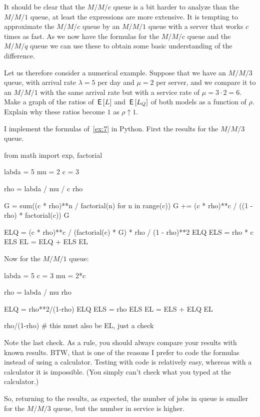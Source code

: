 \begin{exercise}
 It should be clear that the $M/M/c$ queue is a bit harder to analyze than the $M/M/1$ queue, at least the expressions are more extensive.
 It is tempting to approximate the $M/M/c$ queue by an $M/M/1$ queue with a server that works $c$ times as fast.
 As we now have the formulas for the $M/M/c$ queue and the $M/M/q$ queue we can use these to obtain some basic understanding of the difference.
 
 Let us therefore consider a numerical example.
 Suppose that we have an $M/M/3$ queue, with arrival rate $\lambda = 5$ per day and $\mu=2$ per server, and we compare it to an $M/M/1$ with the same arrival rate but with a service rate of $\mu = 3\cdot 2 = 6$.
 Make a graph of the ratios of $\,\mathsf{E}\left[L\right]$ and $\,\mathsf{E}\left[L_Q\right]$ of both models as a function of $\rho$.
 Explain why these ratios become $1$ as $\rho\uparrow 1$. 
\begin{solution}
I implement the formulas of~\cref{ex:7} in Python. First the results for the $M/M/3$ queue.

\begin{pyconsole}
from math import exp, factorial

labda = 5
mu = 2
c = 3

rho = labda / mu / c
rho

G = sum((c * rho)**n / factorial(n) for n in range(c))
G += (c * rho)**c / ((1 - rho) * factorial(c))
G

ELQ = (c * rho)**c / (factorial(c) * G) * rho / (1 - rho)**2
ELQ
ELS = rho * c
ELS
EL = ELQ + ELS
EL
\end{pyconsole}

Now for the $M/M/1$ queue:

\begin{pyconsole}
labda = 5
c = 3
mu = 2*c

rho = labda / mu 
rho

ELQ = rho**2/(1-rho)
ELQ
ELS = rho
ELS
EL = ELS + ELQ
EL

rho/(1-rho) # this must also be EL, just a check
\end{pyconsole}

Note the last check. As a rule, you should always compare your results
with known results. BTW, that is one of the reasons I prefer to code
the formulas instead of using a calculator. Testing with code is
relatively easy, whereas with a calculator it is impossible. (You
simply can't check what you typed at the calculator.)

So, returning to the results, as expected, the number of jobs in queue
is smaller for the $M/M/3$ queue, but the number in service is higher.


\end{solution}
\end{exercise}
